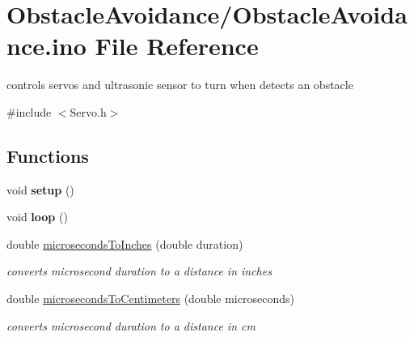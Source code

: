 \hypertarget{ObstacleAvoidance_8ino}{}\section{Obstacle\+Avoidance/\+Obstacle\+Avoidance.ino File Reference}
\label{ObstacleAvoidance_8ino}


controls servos and ultrasonic sensor to turn when detects an obstacle  


{\ttfamily \#include $<$Servo.\+h$>$}\newline
\subsection*{Functions}
\begin{DoxyCompactItemize}
\item 
\mbox{\label{ObstacleAvoidance_8ino_a4fc01d736fe50cf5b977f755b675f11d}} 
void {\bfseries setup} ()
\item 
\mbox{\label{ObstacleAvoidance_8ino_afe461d27b9c48d5921c00d521181f12f}} 
void {\bfseries loop} ()
\item 
double \hyperlink{ObstacleAvoidance_8ino_af3aa08ff26833db406e638b59de8a2e2}{microseconds\+To\+Inches} (double duration)
\begin{DoxyCompactList}\small\item\em converts microsecond duration to a distance in inches \end{DoxyCompactList}\item 
double \hyperlink{ObstacleAvoidance_8ino_ab0174ad16903264a1092448d45512f12}{microseconds\+To\+Centimeters} (double microseconds)
\begin{DoxyCompactList}\small\item\em converts microsecond duration to a distance in cm \end{DoxyCompactList}\end{DoxyCompactItemize}
